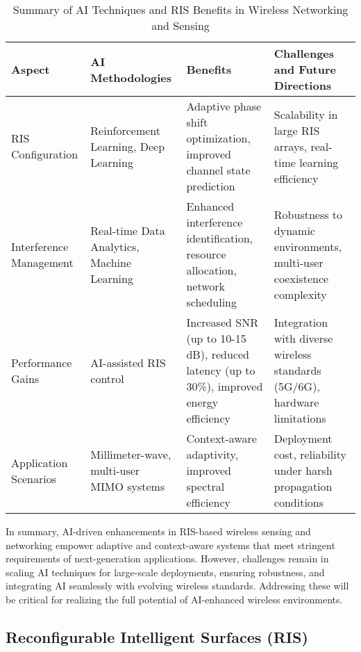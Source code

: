 \documentclass[sigconf]{acmart}
\begin{document}
\begin{table*}[htbp]
\centering
\caption{Summary of AI Techniques and RIS Benefits in Wireless Networking and Sensing}
\label{tab:ai_ris_summary}
\begin{adjustbox}{max width=\textwidth}
\begin{tabular}{@{}llll@{}}
\toprule
\textbf{Aspect} & \textbf{AI Methodologies} & \textbf{Benefits} & \textbf{Challenges and Future Directions} \\ \midrule
RIS Configuration & Reinforcement Learning, Deep Learning & Adaptive phase shift optimization, improved channel state prediction & Scalability in large RIS arrays, real-time learning efficiency \\
Interference Management & Real-time Data Analytics, Machine Learning & Enhanced interference identification, resource allocation, network scheduling & Robustness to dynamic environments, multi-user coexistence complexity \\
Performance Gains & AI-assisted RIS control & Increased SNR (up to 10-15 dB), reduced latency (up to 30\%), improved energy efficiency & Integration with diverse wireless standards (5G/6G), hardware limitations \\
Application Scenarios & Millimeter-wave, multi-user MIMO systems & Context-aware adaptivity, improved spectral efficiency & Deployment cost, reliability under harsh propagation conditions \\ \bottomrule
\end{tabular}
\end{adjustbox}
\end{table*}

In summary, AI-driven enhancements in RIS-based wireless sensing and networking empower adaptive and context-aware systems that meet stringent requirements of next-generation applications. However, challenges remain in scaling AI techniques for large-scale deployments, ensuring robustness, and integrating AI seamlessly with evolving wireless standards. Addressing these will be critical for realizing the full potential of AI-enhanced wireless environments.

\subsection{Reconfigurable Intelligent Surfaces (RIS)}
\end{document}
